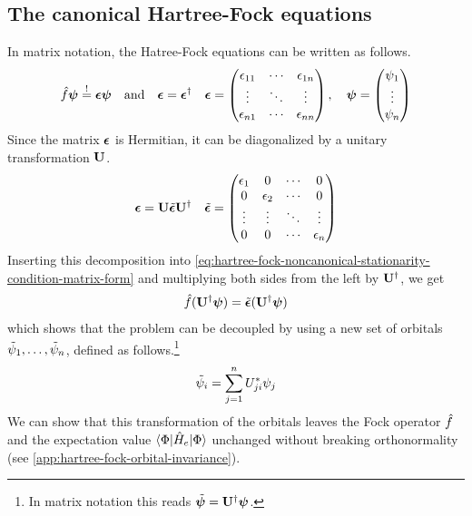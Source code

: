 \documentclass[11pt]{article}
\numberwithin{equation}{section}
\begin{document}
\subsection{The canonical Hartree-Fock equations}

In matrix notation, the Hatree-Fock equations can be written as follows.
\begin{align}\label{eq:hartree-fock-noncanonical-stationarity-condition-matrix-form}
  \op{f}\bm\y
\overset{!}=
  \bm{\ev}\bm{\y}
\hspace{10pt}
  \text{and}
\hspace{10pt}
  \bm{\ev}=\bm{\ev}\dg
&&
  \bm{\ev}
=
  \ma{
    \ev_{11}&\cd&\ev_{1n}\\
    \vd&\dd&\vd\\
    \ev_{n1}&\cd&\ev_{nn}
  },
\hspace{10pt}
  \bm\y
=
  \ma{\y_1\\\vd\\\y_n}
\end{align}
Since the matrix $\bm{\ev}$ is Hermitian, it can be diagonalized by a unitary transformation $\mathbf{U}$.
\begin{align}
  \bm{\ev}
=
  \bo{U}\tl{\bm{\ev}}\bo{U}\dg
&&
  \tl{\bm{\ev}}
=
  \ma{
    \ev_1& 0 & \cd & 0\\
    0 & \ev_2 &\cd & 0\\
    \vd & \vd &\dd & \vd \\
    0 & 0 & \cd & \ev_n
  }
\end{align}
Inserting this decomposition into \cref{eq:hartree-fock-noncanonical-stationarity-condition-matrix-form} and multiplying both sides from the left by $\mathbf{U}^\dagger$, we get
\begin{align*}
  \op{f}(\bo{U}\dg\bm\y)
=
  \tl{\bm{\ev}}(\bo{U}\dg\bm\y)
\end{align*}
which shows that the problem can be decoupled by using a new set of orbitals  $\tilde{\psi }_1,\ldots,\tilde{\psi }_n$, defined as follows.\footnote{In matrix notation this reads $\tl{\bm\y}=\bo{U}\dg\bm\y$.}
\begin{align}
  \tilde{\psi }_i
=
  \sum_{j=1}^n U_{ji}^*\psi _j
\end{align}
We can show that this transformation of the orbitals leaves the Fock operator $\hat{f}$ and the expectation value $\langle\Phi |\hat{H}_e|\Phi \rangle$ unchanged without breaking orthonormality (see \cref{app:hartree-fock-orbital-invariance}).
\end{document}
